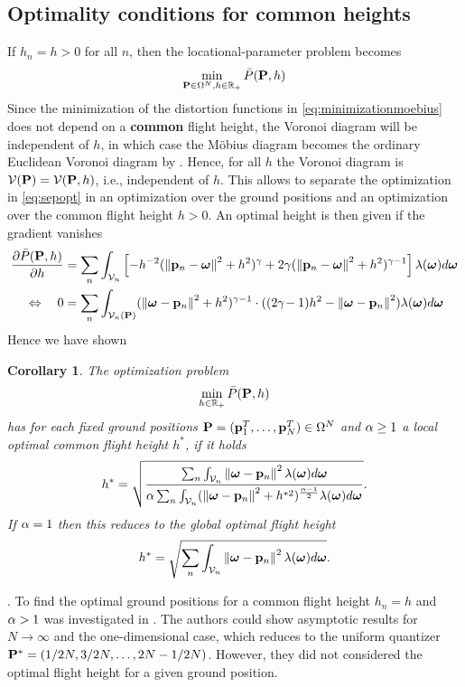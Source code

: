 \documentclass[smallabstract,smallcaptions]{dccpaper}
\newenvironment{remark}{\par\vspace{1.5ex}\noindent{\em Remark\/}.}{\par\vspace{1.5ex}}
\newcommand{\df}{\ensuremath{\lam}}         %
\newcommand{\Pbar}{\ensuremath{\bar{P}}}         %
\newcommand{\Vor}{\ensuremath{\mathcal{V}}}         %
\newtheorem{corollary}{Corollary}
\begin{document}
\subsection{Optimality conditions for common heights}

If $h_n=h>0$ for all $n$, then the locational-parameter problem becomes
%
\begin{align}
  \min_{\vP\in\Omega^N,h\in\R_+} \Pbar(\vP,h) \label{eq:sepopt}
\end{align}
% 
Since the minimization of the distortion functions in \eqref{eq:minimizationmoebius}   does not depend on a {\bfseries
common} flight
height, the Voronoi diagram will be independent of $h$, in which case the Möbius diagram becomes the ordinary Euclidean
Voronoi diagram by .
%
Hence, for all $h$ the Voronoi diagram is $\Vor(\vP)=\Vor(\vP,h)$, i.e., independent of $h$. This allows to separate the
optimization in \eqref{eq:sepopt} in an optimization over the ground positions and an optimization over the common
flight height $h>0$. An optimal height is then given if the gradient vanishes
%
\begin{align}
  \frac{\partial \Pbar(\vP,h)}{\partial h} &= \sum_n{\int_{\Vor_n} \left[-h^{-2}(\Norm{\vp_n-\vome}^2 + h^2)^{\gam} + 2\gam 
    (\Norm{\vp_n-\vome}^2 +h^2)^{\gam-1}\right]
    \df(\vome)d \vome} \notag\\
  \LRA\quad 0 &= \sum_n\int_{\Vor_n(\vP)} (\Norm{\vome-\vp_n}^2+h^2)^{\gam-1} \cdot ((2\gam\!-1)h^2 -\Norm{\vome-\vp_n}^2)
  \df(\vome)d \vome
\end{align}
%
Hence we have shown
%
\begin{corollary}
  The optimization problem 
  \begin{align}
    \min_{h\in\R_+} \Pbar(\vP,h)
  \end{align}
  has for each fixed ground positions $\mathbf P =({\mathbf p}_1^T,\dots,{\mathbf p}_N^T)\in\Omega^N$ and $\alpha\geq 1$ a
  local optimal common flight height $h^*$, if it holds
  \begin{align}
     h^* = \sqrt{\frac{ \sum_n \int_{\Vor_n} \Norm{\vome-\vp_n}^2 \df(\vome)d\vome}{\alp\sum_n \int_{\Vor_n}
     (\Norm{\vome-\vp_n}^2+h^{*2})^{\frac{\alp-1}{2}} \df(\vome)d\vome}}.
   \end{align}
   If $\alpha=1$ then this reduces to the global optimal flight height 
   \begin{align}
      h^{*} =  \sqrt{\sum_n \int_{\Vor_n} \Norm{\vome-\vp_n}^2 \df(\vome)d\vome}.
   \end{align}
\end{corollary}
%
\begin{remark}
  To find the optimal ground positions for a common flight height $h_n=h$ and $\alpha>1$ was investigated in
  \cite[Sec.III]{KSS18}.  The authors could show asymptotic results for $N\to\infty$ and the one-dimensional case, which
  reduces to the uniform quantizer $\mathbf P ^*=(1/2N,3/2N,\dots,2N-1/2N)$. However, they did not considered the optimal
  flight height for a given ground position.
\end{remark}
 
\end{document}

